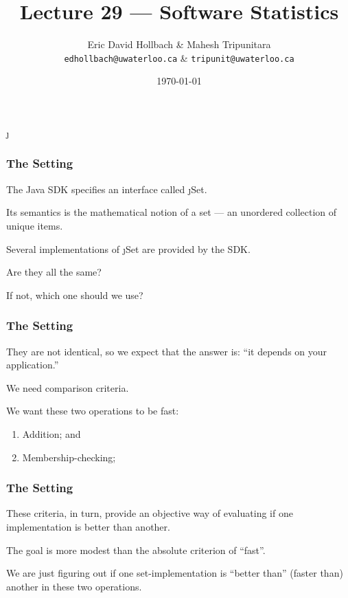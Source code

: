 
\usepackage{tikz-3dplot}
\DeclareUrlCommand\j{}


\title{Lecture 29 --- Software Statistics}

\author{Eric David Hollbach \& Mahesh Tripunitara \\ \small \texttt{edhollbach@uwaterloo.ca} \& \texttt{tripunit@uwaterloo.ca}}
\date{\today}



\begin{frame}
  \titlepage
\end{frame}

\begin{frame}
\frametitle{The Setting}
\begin{changemargin}{1cm}

The Java SDK specifies an interface called \j{Set}. 

Its semantics is the mathematical notion of a set --- an unordered collection of unique items.

Several implementations of \j{Set} are provided by the SDK. 

Are they all the same? 

If not, which one should we use?

\end{changemargin}
\end{frame}

\begin{frame}
\frametitle{The Setting}
\begin{changemargin}{1cm}

They are not identical, so we expect that the answer is: ``it depends on your application.''

We need comparison criteria.

We want these two operations to be fast:
\begin{enumerate}
    \item Addition; and
    \item Membership-checking;
\end{enumerate}

\end{changemargin}
\end{frame}


\begin{frame}
\frametitle{The Setting}
\begin{changemargin}{1cm}

These criteria, in turn, provide an objective way of evaluating if
one implementation is better than another. 

The goal is more modest than the absolute criterion of ``fast''. 

We are just figuring out if one set-implementation
is ``better than'' (faster than) another in these two operations.

\end{changemargin}
\end{frame}

